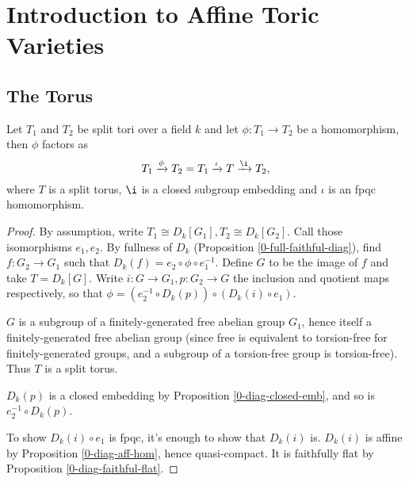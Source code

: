 \section{Introduction to Affine Toric Varieties}


\subsection{The Torus}


\begin{proposition}
  \label{1-1-1-group-hom-subtorus} %

  Let $T_1$ and $T_2$ be split tori over a field $k$ and let $\phi: T_1 \to T_2$ be a homomorphism,
  then $\phi$ factors as
  \[
    T_1 \xrightarrow{\phi} T_2 = T_1 \xrightarrow{\iota} T \xrightarrow{\i} T_2,
  \]
  where $T$ is a split torus,
  $\i$ is a closed subgroup embedding and $\iota$ is an fpqc homomorphism.
\end{proposition}
\begin{proof}

  By assumption, write $T_1 \cong D_k[G_1], T_2 \cong D_k[G_2]$.
  Call those isomorphisms $e_1, e_2$.
  By fullness of $D_k$ (Proposition \ref{0-full-faithful-diag}),
  find $f : G_2 \to G_1$ such that $D_k(f) = e_2 \circ \phi \circ e_1^{-1}$.
  Define $G$ to be the image of $f$ and take $T = D_k[G]$.
  Write $i : G \to G_1, p : G_2 \to G$ the inclusion and quotient maps respectively,
  so that $\phi = (e_2^{-1} \circ D_k(p)) \circ (D_k(i) \circ e_1)$.

  $G$ is a subgroup of a finitely-generated free abelian group $G_1$,
  hence itself a finitely-generated free abelian group
  (since free is equivalent to torsion-free for finitely-generated groups,
  and a subgroup of a torsion-free group is torsion-free).
  Thus $T$ is a split torus.

  $D_k(p)$ is a closed embedding by Proposition \ref{0-diag-closed-emb},
  and so is $e_2^{-1} \circ D_k(p)$.

  To show $D_k(i) \circ e_1$ is fpqc, it's enough to show that $D_k(i)$ is.
  $D_k(i)$ is affine by Proposition \ref{0-diag-aff-hom}, hence quasi-compact.
  It is faithfully flat by Proposition \ref{0-diag-faithful-flat}.
\end{proof}


